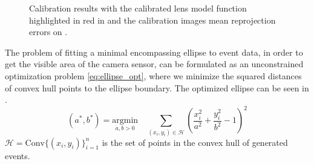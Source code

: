 \begin{figure}[H]
	\centering
	\caption{
		Calibration results with the calibrated lens model function highlighted in red in  and the calibration images mean reprojection errors on .
  }
	\label{fig:calib_r}
\end{figure}

The problem of fitting a minimal encompassing ellipse to event data, in order to get the visible area of the camera sensor, can be formulated
as an unconstrained optimization problem \ref{eq:ellipse_opt}, where we minimize the squared distances of convex hull points to the ellipse boundary.
The optimized ellipse can be seen in .
\begin{equation}
(a^*, b^*) = \underset{a, b > 0}{\text{argmin}} \quad \sum_{(x_i,y_i) \in \mathcal{H}} \left( \frac{x_i^2}{a^2} + \frac{y_i^2}{b^2} - 1 \right)^2
\label{eq:ellipse_opt}
\end{equation}
 $\mathcal{H} = \text{Conv}\{(x_i,y_i)\}_{i=1}^n$ is the set of points in the convex hull of generated events.

